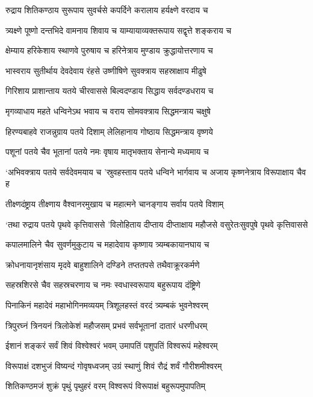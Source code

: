 \twolineshloka
{रुद्राय शितिकण्ठाय सुरूपाय सुवर्चसे}
{कपर्दिने करालाय हर्यक्ष्णे वरदाय च}


\twolineshloka
{त्र्यक्ष्णे पूष्णो दन्तभिदे वामनाय शिवाय च}
{याम्यायाव्यक्तरूपाय सद्वृत्ते शङ्कराय च}


\twolineshloka
{क्षेम्याय हरिकेशाय स्थाणवे पुरुषाय च}
{हरिनेत्राय मुण्डाय क्रुद्धायोत्तरणाय च}


\twolineshloka
{भास्वराय सुतीर्थाय देवदेवाय रंहसे}
{उष्णीषिणे सुवक्त्राय सहस्राक्षाय मीढुषे}


\twolineshloka
{गिरिशाय प्राशान्ताय यतये चीरवाससे}
{बिल्वदण्डाय सिद्धाय सर्वदण्डधराय च}


\twolineshloka
{मृगव्याधाय महते धन्विनेऽथ भवाय च}
{वराय सोमवक्त्राय सिद्धमन्त्राय चक्षुषे}


\twolineshloka
{हिरण्यबाहवे राजन्नुग्राय पतये दिशाम्}
{लेलिहानाय गोष्ठाय सिद्धमन्त्राय वृष्णये}


\twolineshloka
{पशूनां पतये चैव भूतानां पतये नमः}
{वृषाय मातृभक्ताय सेनान्ये मध्यमाय च}


\threelineshloka
{`अभिवक्त्राय पतये सर्वदेवमयाय च}
{'स्रुवहस्ताय पतये धन्विने भार्गवाय च}
{अजाय कृष्णनेत्राय विरूपाक्षाय चैव ह}


\twolineshloka
{तीक्ष्णदंष्ट्राय तीक्ष्णाय वैश्वानरमुखाय च}
{महात्मने चानङ्गाय सर्वाय पतये विशाम्}


\threelineshloka
{`तथा रुद्राय पतये पृथवे कृत्तिवाससे}
{'विलोहिताय दीप्ताय दीप्ताक्षाय महौजसे}
{वसुरेतःसुवपुषे पृथवे कृत्तिवाससे}


\twolineshloka
{कपालमालिने चैव सुवर्णमुकुटाय च}
{महादेवाय कृष्णाय त्र्यम्बकायानघाय च}


\twolineshloka
{क्रोधनायानृशंसाय मृदवे बाहुशालिने}
{दण्डिने तप्ततपसे तथैवाक्रूरकर्मणे}


\twolineshloka
{सहस्रशिरसे चैव सहस्रचरणाय च}
{नमः स्वधास्वरूपाय बहुरूपाय दंष्ट्रिणे}


\twolineshloka
{पिनाकिनं महादेवं महाभोगिनमव्ययम्}
{त्रिशूलहस्तं वरदं त्र्यम्बकं भुवनेश्वरम्}


\twolineshloka
{त्रिपुरघ्नं त्रिनयनं त्रिलोकेशं महौजसम्}
{प्रभवं सर्वभूतानां दातारं धरणीधरम्}


\twolineshloka
{ईशानं शङ्करं सर्वं शिवं विश्वेश्वरं भवम्}
{उमापतिं पशुपतिं विश्वरूपं महेश्वरम्}


\twolineshloka
{विरूपाक्षं दशभुजं विष्यन्दं गोवृषध्वजम्}
{उग्रं स्थाणुं शिवं रौद्रं शर्वं गौरीशमीश्वरम्}


\twolineshloka
{शितिकण्ठमजं शुक्रं पृथुं पृथुहरं वरम्}
{विश्वरूपं विरूपाक्षं बहुरूपमुपापतिम्}


